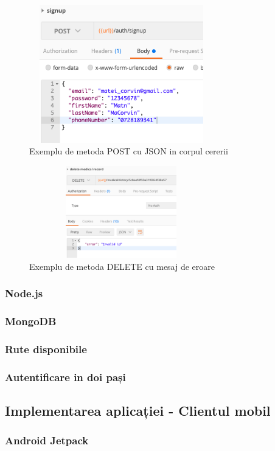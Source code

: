 \documentclass[12pt]{article}
\begin{document}
\begin{figure}[H]
\centering
\includegraphics[width=8cm, height=6cm]{post.png}
\caption{Exemplu de metoda POST cu JSON in corpul cererii}
\end{figure}
    
\begin{figure}[H]
\centering
\includegraphics[width=8cm, height=4cm]{delete.png}
\caption{Exemplu de metoda DELETE cu mesaj de eroare}
\end{figure}
    
\subsubsection{Node.js}
\subsubsection{MongoDB}
\subsubsection{Rute disponibile}
\subsubsection{Autentificare in doi pași}

\subsection{Implementarea aplicației - Clientul mobil}
\subsubsection{Android Jetpack}
\end{document}
